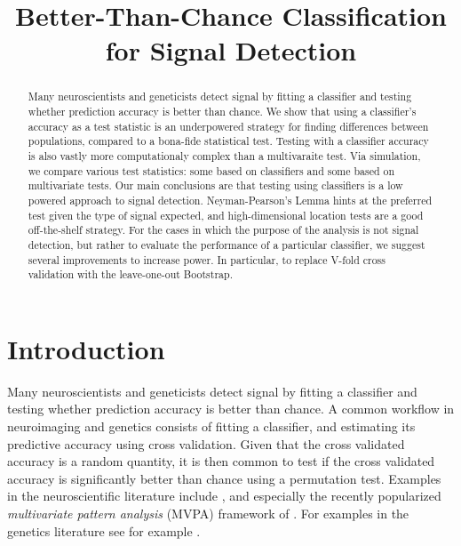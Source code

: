 \documentclass[12pt,a4paper]{article}
\title{Better-Than-Chance Classification for Signal Detection}
\begin{document}


\maketitle

\begin{abstract}
Many neuroscientists and geneticists detect signal by fitting a classifier and testing whether prediction accuracy is better than chance. 
We show that using a classifier's accuracy as a test statistic is an underpowered strategy for finding differences between populations, compared to a bona-fide statistical test.
Testing with a classifier accuracy is also vastly more computationaly complex than a multivaraite test. 
Via simulation, we compare various test statistics: some based on classifiers and some based on multivariate tests. 
Our main conclusions are that testing using classifiers is a low powered approach to signal detection. 
Neyman-Pearson's Lemma hints at the preferred test given the type of signal expected, and high-dimensional location tests are a good off-the-shelf strategy.
For the cases in which the purpose of the analysis is not signal detection, but rather to evaluate the performance of a particular classifier, we suggest several improvements to increase power. In particular, to replace V-fold cross validation with the leave-one-out Bootstrap.%
\end{abstract}


\section{Introduction}
\label{sec:introduction}

Many neuroscientists and geneticists detect signal by fitting a classifier and testing whether prediction accuracy is better than chance. 
A common workflow in neuroimaging and genetics consists of fitting a classifier, and estimating its predictive accuracy using cross validation. 
Given that the cross validated accuracy is a random quantity, it is then common to test if the cross validated accuracy is significantly better than chance using a permutation test.  
Examples in the neuroscientific literature include \citet{golland_permutation_2003,pereira_machine_2009,varoquaux_assessing_2016}, and especially the recently popularized \emph{multivariate pattern analysis} (MVPA) framework of \citet{kriegeskorte_information-based_2006}.
For examples in the genetics literature see for example
\citet{golub_molecular_1999,slonim_class_2000,radmacher_paradigm_2002,mukherjee_estimating_2003,juan_prediction_2004,jiang_calculating_2008}.
\end{document}
